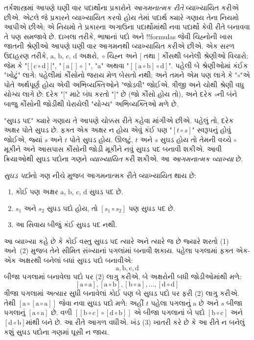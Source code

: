 \documentclass[../../../include/open-logic-section]{subfiles}
\begin{document}


તર્કશાસ્ત્રમાં આપણે ઘણી વાર પદાર્થોના પ્રકારોને
\emph{આગમનાત્મક રીતે} વ્યાખ્યાયિત કરીએ છીએ. એટલે
જે પ્રકારને વ્યાખ્યાયિત કરવો હોય તેમાં પદાર્થ ક્યારે
ગણાય તેના નિયમો આપીએ છીએ; એ નિયમો તે પ્રકારના
અગાઉના પદાર્થોમાંથી નવા પદાર્થો કેવી રીતે બનાવવા
તે પણ સમજાવે છે. દાખલા તરીકે, ભાષાનાં પદો અને
!!{formula}s જેવી ચિહ્નોની ખાસ જાતની શ્રેણીઓ આપણે
ઘણી વાર આગમનથી વ્યાખ્યાયિત કરીએ છીએ. એક સરળ
ઉદાહરણ તરીકે, $\mathrm{a}$, $\mathrm{b}$, $\mathrm{c}$,
$\mathrm{d}$ અક્ષરો,~$\circ$ ચિહ્ન અને $[$ તથા $]$
કૌંસથી બનેલી શ્રેણીઓ વિચારો; જેમ કે
"$[[\mathrm{c} \circ \mathrm{d}][$",
"$[\mathrm{a}[]\circ]$",
"$\mathrm{a}$" અથવા "$[[\mathrm{a} \circ \mathrm{b}]\circ
\mathrm{d}]$". પહેલી બે શ્રેણીઓમાં કંઈક "ખોટું"
લાગે: પહેલીમાં કૌંસોનો જરાય મેળ બેસતો નથી;
અને તમને એમ પણ લાગે કે "$\circ$"એ પોતે અર્થપૂર્ણ
હોય એવી અભિવ્યક્તિઓને "જોડવી" જોઈએ. ત્રીજી
અને ચોથી શ્રેણી વધુ યોગ્ય લાગે છે: દરેક "$[$"
માટે બંધ કરતો "$]$" છે (જો કૌંસો હોય તો), અને
દરેક $\circ$ની બંને બાજુ કૌંસોની જોડીથી ઘેરાયેલી
"યોગ્ય" અભિવ્યક્તિઓ મળે છે.

"સુઘડ પદ" ક્યારે ગણાય તે આપણે ચોક્કસ રીતે કહેવા
માંગીએ છીએ. પહેલું તો, દરેક અક્ષર પોતે સુઘડ છે.
ફક્ત એક અક્ષર ન હોય એવું કંઈ પણ "$[t \circ s]$"
સ્વરૂપનું હોવું જોઈએ, જ્યાં $s$ અને $t$ પોતે
સુઘડ હોય. ઊલટું, $t$ અને $s$ સુઘડ હોય તો તેમની
વચ્ચે $\circ$ મૂકીને અને આસપાસ કૌંસોની જોડી
મૂકીને નવું સુઘડ પદ બનાવી શકીએ. આવી ક્રિયાઓથી
સુઘડ પદોના ગણને \emph{વ્યાખ્યાયિત} કરી શકીએ.
આ \emph{આગમનાત્મક
  વ્યાખ્યા} છે.

\begin{defn}[સુઘડ પદો]
  \emph{સુઘડ પદો}નો ગણ નીચે મુજબ આગમનાત્મક રીતે
  વ્યાખ્યાયિત થાય છે:
  \begin{enumerate}
  \item કોઈ પણ અક્ષર $\mathrm{a}$, $\mathrm{b}$, $\mathrm{c}$,
    $\mathrm{d}$ સુઘડ પદ છે.
  \item $s_1$ અને $s_2$ સુઘડ પદો હોય, તો
    $[s_1 \circ s_2]$ પણ સુઘડ પદ છે.
  \item આ સિવાય બીજું કંઈ સુઘડ પદ નથી.
  \end{enumerate}
\end{defn}

આ વ્યાખ્યા કહે છે કે કોઈ વસ્તુ સુઘડ પદ ત્યારે અને
ત્યારે જ છે જ્યારે શરતો (1) અને~(2) મુજબ તેને
સીમિત સંખ્યાનાં પગલાંમાં બનાવી શકાય. પહેલા પગલામાં
ફક્ત એક-એક અક્ષરથી બનેલાં બધાં સુઘડ પદો બનાવીએ:
\[
\mathrm{a}, \mathrm{b}, \mathrm{c}, \mathrm{d}
\]
બીજા પગલામાં બનાવેલા પદો પર (2) લાગુ કરીએ. બે
અક્ષરોની બધી જોડીઓમાંથી મળે:
\[
[\mathrm{a} \circ \mathrm{a}], [\mathrm{a} \circ \mathrm{b}],
[\mathrm{b} \circ \mathrm{a}], \dots, [\mathrm{d} \circ \mathrm{d}]
\]
ત્રીજા પગલામાં અત્યાર સુધી બનાવેલાં કોઈ પણ બે
સુઘડ પદો પર ફરી (2) લાગુ કરીએ. તેથી
$[\mathrm{a} \circ [\mathrm{a} \circ
    \mathrm{a}]]$ જેવા નવા સુઘડ પદો મળે: અહીં $t$
પહેલા પગલાનું $\mathrm{a}$ છે અને $s$ બીજા પગલાનું
$[\mathrm{a} \circ \mathrm{a}]$ છે. વળી
$[[\mathrm{b} \circ
    \mathrm{c}] \circ [\mathrm{d} \circ \mathrm{b}]]$
એ બીજા પગલાનાં બે પદો $[\mathrm{b} \circ \mathrm{c}]$
અને $[\mathrm{d}
  \circ \mathrm{b}]$માંથી બને છે. આ રીતે આગળ
વધીએ. ખંડ (3) ખાતરી કરે છે કે આ રીતે ન બનેલું
કશું સુઘડ પદોના ગણમાં ઘૂસી ન જાય.
\end{document}
